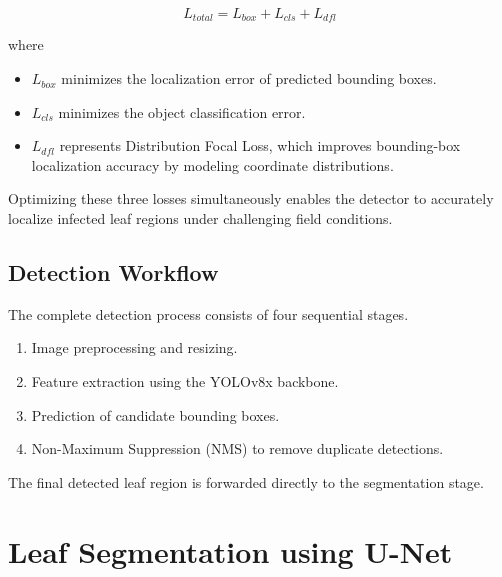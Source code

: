 \[
L_{total}=L_{box}+L_{cls}+L_{dfl}
\]

where

\begin{itemize}[leftmargin=*]

\item $L_{box}$ minimizes the localization error of predicted bounding boxes.

\item $L_{cls}$ minimizes the object classification error.

\item $L_{dfl}$ represents Distribution Focal Loss, which improves bounding-box localization accuracy by modeling coordinate distributions.

\end{itemize}

Optimizing these three losses simultaneously enables the detector to accurately localize infected leaf regions under challenging field conditions.

\subsection{Detection Workflow}

The complete detection process consists of four sequential stages.

\begin{enumerate}[leftmargin=*,label=\textbf{D\arabic*.}]

\item Image preprocessing and resizing.

\item Feature extraction using the YOLOv8x backbone.

\item Prediction of candidate bounding boxes.

\item Non-Maximum Suppression (NMS) to remove duplicate detections.

\end{enumerate}

The final detected leaf region is forwarded directly to the segmentation stage.

\section{Leaf Segmentation using U-Net}
\label{sec:unet_methodology}

